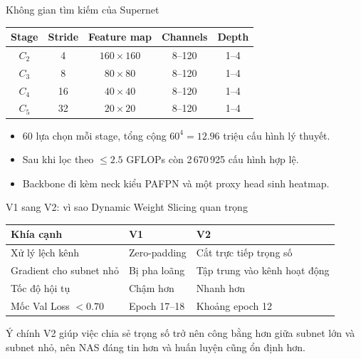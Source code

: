 \documentclass[aspectratio=169,11pt]{beamer}
\begin{document}
\begin{frame}{Không gian tìm kiếm của Supernet}
  \small
  \begin{tabular}{@{}ccccc@{}}
    \toprule
    Stage & Stride & Feature map & Channels & Depth \\
    \midrule
    \(C_2\) & 4  & \(160 \times 160\) & 8--120 & 1--4 \\
    \(C_3\) & 8  & \(80 \times 80\)   & 8--120 & 1--4 \\
    \(C_4\) & 16 & \(40 \times 40\)   & 8--120 & 1--4 \\
    \(C_5\) & 32 & \(20 \times 20\)   & 8--120 & 1--4 \\
    \bottomrule
  \end{tabular}

  \vspace{8pt}
  \begin{itemize}
    \setlength{\itemsep}{4pt}
    \item 60 lựa chọn mỗi stage, tổng cộng \(60^4 = 12.96\) triệu cấu hình lý thuyết.
    \item Sau khi lọc theo \(\leq 2.5\) GFLOPs còn 2\,670\,925 cấu hình hợp lệ.
    \item Backbone đi kèm neck kiểu PAFPN và một proxy head sinh heatmap.
  \end{itemize}
\end{frame}

\begin{frame}{V1 sang V2: vì sao Dynamic Weight Slicing quan trọng}
  \small
  \begin{tabular}{@{}p{}p{}p{}@{}}
    \toprule
    Khía cạnh & V1 & V2 \\
    \midrule
    Xử lý lệch kênh & Zero-padding & Cắt trực tiếp trọng số \\
    Gradient cho subnet nhỏ & Bị pha loãng & Tập trung vào kênh hoạt động \\
    Tốc độ hội tụ & Chậm hơn & Nhanh hơn \\
    Mốc Val Loss \(<0.70\) & Epoch 17--18 & Khoảng epoch 12 \\
    \bottomrule
  \end{tabular}

  \vspace{8pt}
  \begin{block}{Ý chính}
    V2 giúp việc chia sẻ trọng số trở nên công bằng hơn giữa subnet lớn và subnet nhỏ, nên NAS đáng tin hơn và huấn luyện cũng ổn định hơn.
  \end{block}
\end{frame}
\end{document}
